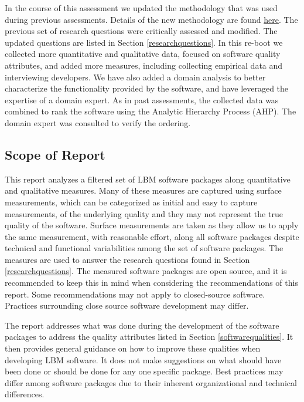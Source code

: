 \documentclass[12pt, notitlepage]{article}
\begin{document}
In the course of this assessment we updated the methodology that was used during previous assessments. Details of the new methodology are found \href{https://github.com/smiths/AIMSS/blob/master/StateOfPractice/Methodology/Methodology.pdf}{here}. The previous set of research questions were critically assessed and modified. The updated questions are listed in Section \ref{researchquestions}. In this re-boot we collected more quantitative and qualitative data, focused on software quality attributes, and added more measures, including collecting empirical data and interviewing developers. We have also added a domain analysis to better characterize the functionality provided by the software, and have leveraged the expertise of a domain expert. As in past assessments, the collected data was combined to rank the software using the Analytic Hierarchy Process (AHP). The domain expert was consulted to verify the ordering.

\subsection{Scope of Report}

This report analyzes a filtered set of LBM software packages along quantitative and qualitative measures. Many of these measures are captured using surface measurements, which can be categorized as initial and easy to capture measurements, of the underlying quality and they may not represent the true quality of the software. Surface measurements are taken as they allow us to apply the same measurement, with reasonable effort, along all software packages despite technical and functional variabilities among the set of software packages. The measures are used to answer the research questions found in Section \ref{researchquestions}. The measured software packages are open source, and it is recommended to keep this in mind when considering the recommendations of this report. Some recommendations may not apply to closed-source software. Practices surrounding close source software development may differ.

The report addresses what was done during the development of the software packages to address the quality attributes listed in Section \ref{softwarequalities}. It then provides general guidance on how to improve these qualities when developing LBM software. It does not make suggestions on what should have been done or should be done for any one specific package. Best practices may differ among software packages due to their inherent organizational and technical differences. 
\end{document}
